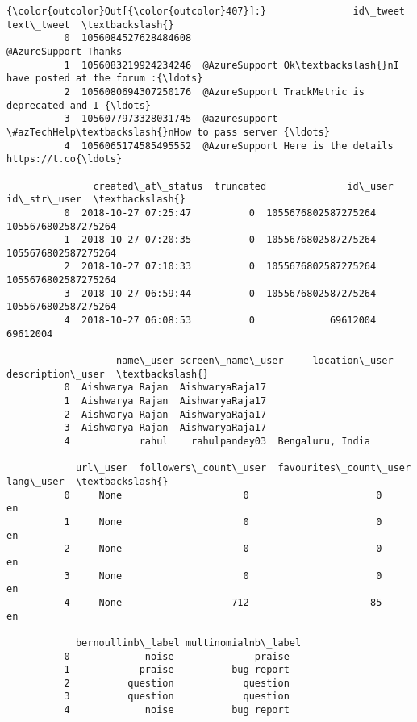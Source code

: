 \documentclass[11pt]{article}
\begin{document}
\begin{Verbatim}[commandchars=\\\{\}]
{\color{outcolor}Out[{\color{outcolor}407}]:}               id\_tweet                                         text\_tweet  \textbackslash{}
          0  1056084527628484608                               @AzureSupport Thanks   
          1  1056083219924234246  @AzureSupport Ok\textbackslash{}nI have posted at the forum :{\ldots}   
          2  1056080694307250176  @AzureSupport TrackMetric is deprecated and I {\ldots}   
          3  1056077973328031745  @azuresupport \#azTechHelp\textbackslash{}nHow to pass server {\ldots}   
          4  1056065174585495552  @AzureSupport Here is the details https://t.co{\ldots}   
          
               created\_at\_status  truncated              id\_user          id\_str\_user  \textbackslash{}
          0  2018-10-27 07:25:47          0  1055676802587275264  1055676802587275264   
          1  2018-10-27 07:20:35          0  1055676802587275264  1055676802587275264   
          2  2018-10-27 07:10:33          0  1055676802587275264  1055676802587275264   
          3  2018-10-27 06:59:44          0  1055676802587275264  1055676802587275264   
          4  2018-10-27 06:08:53          0             69612004             69612004   
          
                   name\_user screen\_name\_user     location\_user description\_user  \textbackslash{}
          0  Aishwarya Rajan  AishwaryaRaja17                                      
          1  Aishwarya Rajan  AishwaryaRaja17                                      
          2  Aishwarya Rajan  AishwaryaRaja17                                      
          3  Aishwarya Rajan  AishwaryaRaja17                                      
          4            rahul    rahulpandey03  Bengaluru, India                    
          
            url\_user  followers\_count\_user  favourites\_count\_user lang\_user  \textbackslash{}
          0     None                     0                      0        en   
          1     None                     0                      0        en   
          2     None                     0                      0        en   
          3     None                     0                      0        en   
          4     None                   712                     85        en   
          
            bernoullinb\_label multinomialnb\_label  
          0             noise              praise  
          1            praise          bug report  
          2          question            question  
          3          question            question  
          4             noise          bug report  
\end{Verbatim}
            
\end{document}
